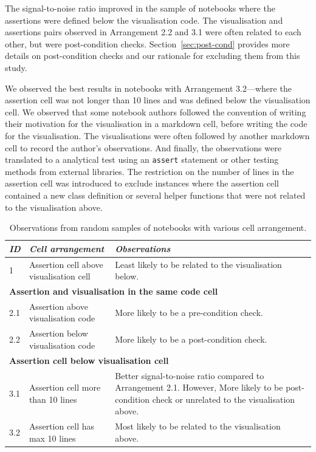 \documentclass[conference]{IEEEtran}
\begin{document}
The signal-to-noise ratio improved in the sample of notebooks where the assertions were defined below the visualisation code. The visualisation and assertions pairs observed in Arrangement 2.2 and 3.1 were often related to each other, but were post-condition checks. Section~\ref{sec:post-cond} provides more details on post-condition checks and our rationale for excluding them from this study.

We observed the best results in notebooks with Arrangement 3.2---where the assertion cell was not longer than 10 lines and was defined below the visualisation cell. We observed that some notebook authors followed the convention of writing their motivation for the visualisation in a markdown cell, before writing the code for the visualisation. The visualisations were often followed by another markdown cell to record the author's observations. And finally, the observations were translated to a analytical test using an \texttt{assert} statement or other testing methods from external libraries. The restriction on the number of lines in the assertion cell was introduced to exclude instances where the assertion cell contained a new class definition or several helper functions that were not related to the visualisation above.

\begin{table}
  \centering
  \caption{Observations from random samples of notebooks with various
  cell arrangement.}
  \begin{tabular}{@{}l p{} p{}@{}}
    \toprule
    \emph{\textbf{ID}}&
    \emph{\textbf{Cell arrangement}} &
    \emph{\textbf{Observations}}\\
    \midrule
    1 &
    Assertion cell above visualisation cell &
    Least likely to be related to the visualisation below.\\
    \midrule
    \multicolumn{3}{l}{\textbf{Assertion and visualisation in the same code cell}}\\
    \midrule
    2.1 &
    Assertion above visualisation code &
    More likely to be a pre-condition check.\\
    2.2 &
    Assertion below visualisation code &
    More likely to be a post-condition check.\\
    \midrule
    \multicolumn{3}{l}{\textbf{Assertion cell below visualisation cell}}\\
    \midrule
    3.1 &
    Assertion cell more than 10 lines &
    Better signal-to-noise ratio compared to Arrangement 2.1. However, More likely to be post-condition check or unrelated to the visualisation above.\\
    3.2 &
    Assertion cell has max 10 lines &
    Most likely to be related to the visualisation above.\\
    \bottomrule
  \end{tabular}
  \label{tab:cell-arrangement}
\end{table}
\end{document}
